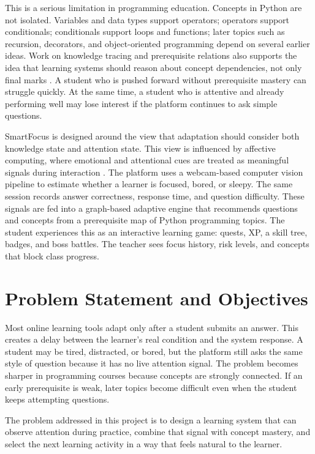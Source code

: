 \documentclass[conference]{IEEEtran}
\begin{document}
This is a serious limitation in programming education. Concepts in Python are not isolated. Variables and data types support operators; operators support conditionals; conditionals support loops and functions; later topics such as recursion, decorators, and object-oriented programming depend on several earlier ideas. Work on knowledge tracing and prerequisite relations also supports the idea that learning systems should reason about concept dependencies, not only final marks \cite{corbett1994knowledge,pan2017prerequisite}. A student who is pushed forward without prerequisite mastery can struggle quickly. At the same time, a student who is attentive and already performing well may lose interest if the platform continues to ask simple questions.

SmartFocus is designed around the view that adaptation should consider both knowledge state and attention state. This view is influenced by affective computing, where emotional and attentional cues are treated as meaningful signals during interaction \cite{picard1997affective,dmello2012dynamics}. The platform uses a webcam-based computer vision pipeline to estimate whether a learner is focused, bored, or sleepy. The same session records answer correctness, response time, and question difficulty. These signals are fed into a graph-based adaptive engine that recommends questions and concepts from a prerequisite map of Python programming topics. The student experiences this as an interactive learning game: quests, XP, a skill tree, badges, and boss battles. The teacher sees focus history, risk levels, and concepts that block class progress.

\section{Problem Statement and Objectives}

Most online learning tools adapt only after a student submits an answer. This creates a delay between the learner's real condition and the system response. A student may be tired, distracted, or bored, but the platform still asks the same style of question because it has no live attention signal. The problem becomes sharper in programming courses because concepts are strongly connected. If an early prerequisite is weak, later topics become difficult even when the student keeps attempting questions.

The problem addressed in this project is to design a learning system that can observe attention during practice, combine that signal with concept mastery, and select the next learning activity in a way that feels natural to the learner.
\end{document}
